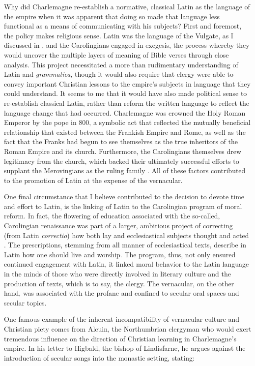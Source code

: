 Why did Charlemagne re-establish a normative, classical Latin as the language of the empire when it was apparent that doing so made that language less functional as a means of communicating with his subjects? First and foremost, the policy makes religious sense. Latin was the language of the Vulgate, as I discussed in , and the Carolingians engaged in exegesis, the process whereby they would uncover the multiple layers of meaning of Bible verses through close analysis. This project necessitated a more than rudimentary understanding of Latin and \textit{grammatica}, though it would also require that clergy were able to convey important Christian lessons to the empire’s subjects in language that they could understand. It seems to me that it would have also made political sense to re-establish classical Latin, rather than reform the written language to reflect the language change that had occurred. Charlemagne was crowned the Holy Roman Emperor by the pope in 800, a symbolic act that reflected the mutually beneficial relationship that existed between the Frankish Empire and Rome, as well as the fact that the Franks had begun to see themselves as the true inheritors of the Roman Empire and its church. Furthermore, the Carolingians themselves drew legitimacy from the church, which backed their ultimately successful efforts to supplant the Merovingians as the ruling family \citep[383]{Wickham2009}. All of these factors contributed to the promotion of Latin at the expense of the vernacular.

One final circumstance that I believe contributed to the decision to devote time and effort to Latin, is the linking of Latin to the Carolingian program of moral reform. In fact, the flowering of education associated with the so-called, Carolingian renaissance was part of a larger, ambitious project of correcting (from Latin \textit{correctio}) how both lay and ecclesiastical subjects thought and acted \citep[382--383]{Wickham2009}. The prescriptions, stemming from all manner of ecclesiastical texts, describe in Latin how one should live and worship. The program, thus, not only ensured continued engagement with Latin, it linked moral behavior to the Latin language in the minds of those who were directly involved in literary culture and the production of texts, which is to say, the clergy. The vernacular, on the other hand, was associated with the profane and confined to secular oral spaces and secular topics.

One famous example of the inherent incompatibility of vernacular culture and Christian piety comes from Alcuin, the Northumbrian clergyman who would exert tremendous influence on the direction of Christian learning in Charlemagne’s empire. In his letter to Higbald, the bishop of Lindisfarne, he argues against the introduction of secular songs into the monastic setting, stating:

